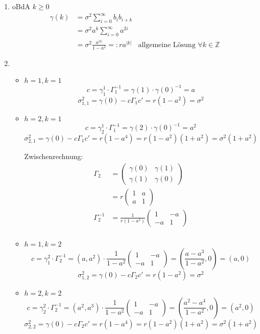 \documentclass[a4paper,11pt,notitlepage,fullpage]{article}
\begin{document}
\begin{enumerate}
\begin{enumerate}
\item oBdA $k \geq 0$
\begin{align*}
\gamma(k) &= \sigma^2 \sum_{i = 0}^\infty b_i b_{i+k} \\
&= \sigma^2 a^k \sum_{i = 0}^\infty a^{2i} \\
&= \sigma^2 \frac{a^{|k|}}{1-a^2} =: r a^{|k|} &\text{allgemeine Lösung }\forall k \in \mathbb Z
\end{align*}

\item 
\begin{itemize}
\item $h = 1, k = 1$
$$
c = \gamma_1^1 \cdot \Gamma_1^{-1} = \gamma(1) \cdot \gamma(0)^{-1} = a
$$$$
\sigma_{1,1}^2 = \gamma(0) - c\Gamma_1 c' = r(1-a^2) = \sigma^2
$$

\item $h = 2, k = 1$
$$
c = \gamma_2^1 \cdot \Gamma_1^{-1} = \gamma(2) \cdot \gamma(0)^{-1} = a^2
$$$$
\sigma_{2,1}^2 = \gamma(0) - c\Gamma_1 c' = r(1-a^4) = r(1-a^2)(1+a^2) = \sigma^2(1+a^2)
$$

Zwischenrechnung: 
\begin{align*}
\Gamma_2 &= \begin{pmatrix}
\gamma(0) & \gamma(1) \\
\gamma(1) & \gamma(0)
\end{pmatrix} \\
&= r\begin{pmatrix}
1 & a \\
a & 1
\end{pmatrix} \\
\Gamma_2^{-1} &= \frac{1}{r(1 - a^2)} \begin{pmatrix}
1 & -a \\
-a & 1
\end{pmatrix} \\
\end{align*}

\item $h = 1, k = 2$
$$
c = \gamma_1^2 \cdot \Gamma_2^{-1} =  (a, a^2) \cdot \frac{1}{1 - a^2}\begin{pmatrix}
1 & -a \\
-a & 1
\end{pmatrix} = (\frac{a-a^3}{1-a^2}, 0) = (a, 0)
$$$$
\sigma_{1,2}^2 = \gamma(0) - c\Gamma_2 c' = r(1-a^2) = \sigma^2
$$

\item $h = 2, k = 2$
$$
c = \gamma_2^2 \cdot \Gamma_2^{-1} =  (a^2, a^3) \cdot \frac{1}{1 - a^2}\begin{pmatrix}
1 & -a \\
-a & 1
\end{pmatrix} = (\frac{a^2-a^4}{1-a^2}, 0) = (a^2, 0)
$$$$
\sigma_{2,2}^2 = \gamma(0) - c\Gamma_2 c' = r(1-a^4) = r(1-a^2)(1+a^2) = \sigma^2(1+a^2)
$$


\end{itemize}
\end{enumerate}
\end{enumerate}
\end{document}
